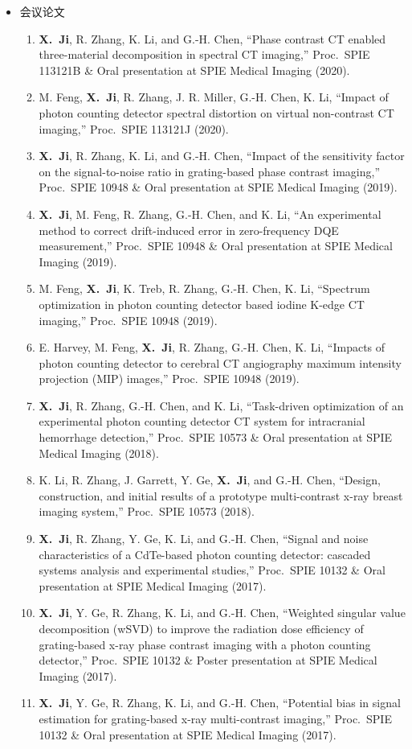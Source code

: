 \documentclass[letterpaper,11pt]{article}
\newcommand{\xji}{\textbf{X.~Ji}}
\begin{document}
\begin{CJK}{UTF8}{song}
\begin{itemize}
\item 会议论文
\begin{enumerate}\justifying
\item \xji, R. Zhang, K. Li, and G.-H. Chen, ``Phase contrast CT enabled three-material decomposition in spectral CT imaging,'' Proc.~SPIE 113121B \& Oral presentation at SPIE Medical Imaging (2020).
\item M. Feng, \xji, R. Zhang, J. R. Miller, G.-H. Chen, K. Li, ``Impact of photon counting detector spectral distortion on virtual non-contrast CT imaging,'' Proc.~SPIE 113121J (2020).
\item \xji, R. Zhang, K. Li, and G.-H. Chen, ``Impact of the sensitivity factor on the signal-to-noise ratio in grating-based phase contrast imaging,'' Proc.~SPIE 10948 \& Oral presentation at SPIE Medical Imaging (2019).
\item \xji, M. Feng, R. Zhang, G.-H. Chen, and K. Li, ``An experimental method to correct drift-induced error in zero-frequency DQE measurement,'' Proc.~SPIE 10948 \& Oral presentation at SPIE Medical Imaging (2019).
\item M. Feng, \xji, K. Treb, R. Zhang, G.-H. Chen, K. Li, ``Spectrum optimization in photon counting detector based iodine K-edge CT imaging,'' Proc.~SPIE 10948 (2019).
\item E. Harvey, M. Feng, \xji, R. Zhang, G.-H. Chen, K. Li, ``Impacts of photon counting detector to cerebral CT angiography maximum intensity projection (MIP) images,'' Proc.~SPIE 10948 (2019).
\item \xji, R. Zhang, G.-H. Chen, and K. Li, ``Task-driven optimization of an experimental photon counting detector CT system for intracranial hemorrhage detection,'' Proc.~SPIE 10573 \& Oral presentation at SPIE Medical Imaging (2018).
\item K. Li, R. Zhang, J. Garrett, Y. Ge, \xji, and G.-H. Chen, ``Design, construction, and initial results of a prototype multi-contrast x-ray breast imaging system,'' Proc.~SPIE 10573 (2018).
\item \xji, R. Zhang, Y. Ge, K. Li, and G.-H. Chen, ``Signal and noise characteristics of a CdTe-based photon counting detector: cascaded systems analysis and experimental studies,'' Proc.~SPIE 10132 \& Oral presentation at SPIE Medical Imaging (2017).
\item \xji, Y. Ge, R. Zhang, K. Li, and G.-H. Chen, ``Weighted singular value decomposition (wSVD) to improve the radiation dose efficiency of grating-based x-ray phase contrast imaging with a photon counting detector,'' Proc.~SPIE 10132 \& Poster presentation at SPIE Medical Imaging (2017).
\item \xji, Y. Ge, R. Zhang, K. Li, and G.-H. Chen, ``Potential bias in signal estimation for grating-based x-ray multi-contrast imaging,'' Proc.~SPIE 10132 \& Oral presentation at SPIE Medical Imaging (2017).
\end{enumerate}
 

\end{itemize}
\end{CJK}
\end{document}
